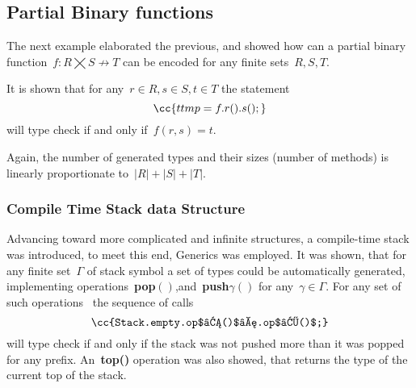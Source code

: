 \subsection*{Partial Binary functions}
The next example elaborated the previous, and showed
  how can a partial binary function~$f:R⨉S↛T$
  can be encoded for any finite sets~$R,S,T$.

It is shown that for any~$r∈R , s∈S , t∈T$
  the statement
\[
  \cc{t tmp = f.r().s();}
\]
  will type check if and only if~$f(r,s)=t$.

Again, the number of generated types and their sizes (number of methods)
  is linearly proportionate to~$|R|+|S|+|T|$.

\subsubsection*{Compile Time Stack data Structure}
Advancing toward more complicated and infinite structures,
  a compile-time stack was introduced, to meet this end,
  \Java Generics was employed.
It was shown, that for any finite set~$Γ$ of stack symbol
  a set of \Java types could be automatically generated,
  implementing operations~\textbf{pop$()$},and~\textbf{push$γ()$}
  for any~$γ∈Γ$.
For any set of such operations~ the sequence of calls\[
  \cc{Stack.empty.op$₁()$….op$ₖ()$;}
\]
will type check if and only if the stack was not pushed more
  than it was popped for any prefix.
An~\textbf{top()} operation was also showed, that returns the type
  of the current top of the stack.


